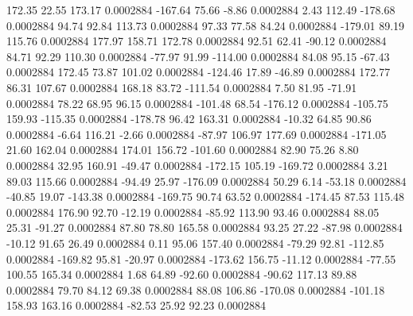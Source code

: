       172.35       22.55      173.17     0.0002884
     -167.64       75.66       -8.86     0.0002884
        2.43      112.49     -178.68     0.0002884
       94.74       92.84      113.73     0.0002884
       97.33       77.58       84.24     0.0002884
     -179.01       89.19      115.76     0.0002884
      177.97      158.71      172.78     0.0002884
       92.51       62.41      -90.12     0.0002884
       84.71       92.29      110.30     0.0002884
      -77.97       91.99     -114.00     0.0002884
       84.08       95.15      -67.43     0.0002884
      172.45       73.87      101.02     0.0002884
     -124.46       17.89      -46.89     0.0002884
      172.77       86.31      107.67     0.0002884
      168.18       83.72     -111.54     0.0002884
        7.50       81.95      -71.91     0.0002884
       78.22       68.95       96.15     0.0002884
     -101.48       68.54     -176.12     0.0002884
     -105.75      159.93     -115.35     0.0002884
     -178.78       96.42      163.31     0.0002884
      -10.32       64.85       90.86     0.0002884
       -6.64      116.21       -2.66     0.0002884
      -87.97      106.97      177.69     0.0002884
     -171.05       21.60      162.04     0.0002884
      174.01      156.72     -101.60     0.0002884
       82.90       75.26        8.80     0.0002884
       32.95      160.91      -49.47     0.0002884
     -172.15      105.19     -169.72     0.0002884
        3.21       89.03      115.66     0.0002884
      -94.49       25.97     -176.09     0.0002884
       50.29        6.14      -53.18     0.0002884
      -40.85       19.07     -143.38     0.0002884
     -169.75       90.74       63.52     0.0002884
     -174.45       87.53      115.48     0.0002884
      176.90       92.70      -12.19     0.0002884
      -85.92      113.90       93.46     0.0002884
       88.05       25.31      -91.27     0.0002884
       87.80       78.80      165.58     0.0002884
       93.25       27.22      -87.98     0.0002884
      -10.12       91.65       26.49     0.0002884
        0.11       95.06      157.40     0.0002884
      -79.29       92.81     -112.85     0.0002884
     -169.82       95.81      -20.97     0.0002884
     -173.62      156.75      -11.12     0.0002884
      -77.55      100.55      165.34     0.0002884
        1.68       64.89      -92.60     0.0002884
      -90.62      117.13       89.88     0.0002884
       79.70       84.12       69.38     0.0002884
       88.08      106.86     -170.08     0.0002884
     -101.18      158.93      163.16     0.0002884
      -82.53       25.92       92.23     0.0002884
